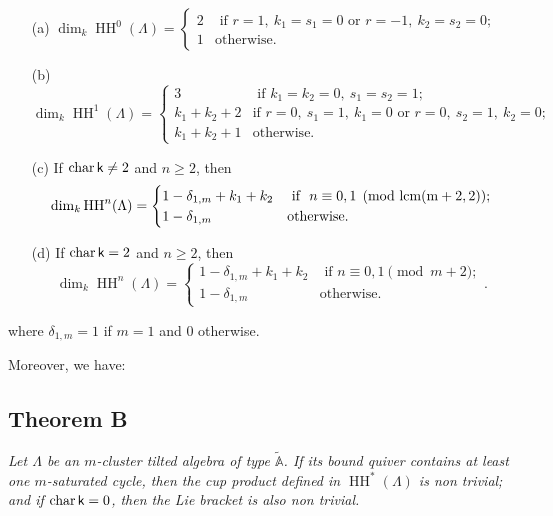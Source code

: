 \documentclass{amsart}
\theoremstyle{plain}
\theoremstyle{definition}
\begin{document}
\begin{itemize}
\item[(a)] ${\operatorname{dim}_k\operatorname{HH}^{{0}}(\Lambda)}= \begin{cases} 2 & \mbox{ if \ }  r=1,  \  k_1=s_1=0 \text{ or  }  r=-1,  \  k_2=s_2=0;
\\
 1  & \mbox{otherwise}. \end{cases}$

\item[(b)] ${\operatorname{dim}_k\operatorname{HH}^{{1}}(\Lambda)}= \begin{cases} 3 & \mbox{ if \ }  k_1=k_2=0, \  s_1=s_2=1 ;
\\
 k_1+k_2+2  & \mbox{if \ }  r=0,  \  s_1=1,  \  k_1=0 \text{ or  }  r=0,  \  s_2=1,  \  k_2=0 ; \\
k_1+k_2 + 1 & \mbox{otherwise}. \end{cases}$

\item[(c)] If $\operatorname{char}{{\normalfont{\textsf{k}}}}\neq 2$ and $n\geq 2$, then $${\operatorname{dim}_k\operatorname{HH}^{{n}}(\Lambda)}= \begin{cases} 1-\delta_{1,m}+ k_1+k_2 & \mbox{ if \ } n\equiv 0,1 \pmod{\rm lcm(m+2,2)}; \\ 1-\delta_{1,m} &
\mbox{otherwise.} \end{cases}$$

\item[(d)] If $\operatorname{char}{{\normalfont{\textsf{k}}}}= 2$ and $n\geq 2$, then $${\operatorname{dim}_k\operatorname{HH}^{{n}}(\Lambda)}= \begin{cases} 1-\delta_{1,m}+k_1+k_2 & \mbox{ if \ } n\equiv 0,1 \pmod{m+2};\\ 1-\delta_{1,m} & \mbox{otherwise.} \end{cases}.$$
\end{itemize}

where $\delta_{1,m}=1$ if $m=1$ and $0$ otherwise.

Moreover, we have:

\subsection*{Theorem B}\textit{ Let $\Lambda$ be an  $m$-cluster tilted algebra of type $\tilde{\mathbb{A}}$.
If its bound quiver contains at least one $m$-saturated cycle,
then the cup product defined in $\operatorname{HH}^*(\Lambda)$ is non trivial; and if $\operatorname{char}{{\normalfont{\textsf{k}}}}=0$, then the Lie bracket is also
non trivial.}
\medskip
\end{document}

